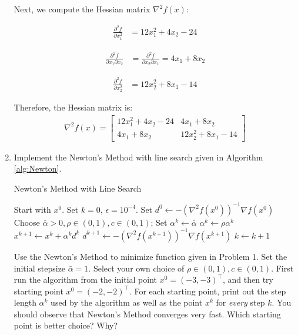 \documentclass[11pt]{article}
\begin{document}
\begin{enumerate}
Next, we compute the Hessian matrix $\nabla^2 f(x)$:

\begin{align}
\frac{\partial^2 f}{\partial x_1^2} &= 12x_1^2 + 4x_2 - 24
\end{align}

\begin{align}
\frac{\partial^2 f}{\partial x_1 \partial x_2} &= \frac{\partial^2 f}{\partial x_2 \partial x_1} = 4x_1 + 8x_2
\end{align}

\begin{align}
\frac{\partial^2 f}{\partial x_2^2} &= 12x_2^2 + 8x_1 - 14
\end{align}

Therefore, the Hessian matrix is:
\begin{align}
\nabla^2 f(x) = \begin{bmatrix}
12x_1^2 + 4x_2 - 24 & 4x_1 + 8x_2 \\
4x_1 + 8x_2 & 12x_2^2 + 8x_1 - 14
\end{bmatrix}
\end{align}
    
\item Implement the Newton's Method with line search given in Algorithm \ref{alg:Newton}.
    \begin{algorithm}
    \caption{Newton's Method with Line Search}
    \label{alg:Newton}
     \begin{algorithmic}
        \State Start with $x^0$. Set $k=0$, $\epsilon = 10^{-4}$.
        \State Set $d^0 \leftarrow -(\nabla^2 f(x^0))^{-1}\nabla f(x^0)$
            \State Choose $\bar{\alpha}>0, \rho\in(0,1), c\in(0,1)$; Set $\alpha^k\leftarrow\bar{\alpha}$
                \State $\alpha^k \leftarrow \rho \alpha^k$
            \EndWhile
            \State $x^{k+1}\leftarrow x^k + \alpha^k d^k$
            \State $d^{k+1} \leftarrow -(\nabla^2 f(x^{k+1}))^{-1}\nabla f(x^{k+1})$
            \State $k\leftarrow k+1$
        \EndWhile
    \end{algorithmic}
    \end{algorithm}
    
    Use the Newton's Method to minimize function given in Problem 1. Set the initial stepsize $\bar{\alpha}=1$. Select your own choice of $\rho\in (0,1), c\in (0,1)$. First run the algorithm from the initial point $x^0=(-3, -3)^\top$, and then try starting point $x^0 = (-2, -2)^\top$. For each starting point, print out the step length $\alpha^k$ used by the algorithm as well as the point $x^k$ for \emph{every} step $k$. 
    You should observe that Newton's Method converges very fast. 
    Which starting point is better choice? Why?


\end{enumerate}
\end{document}
